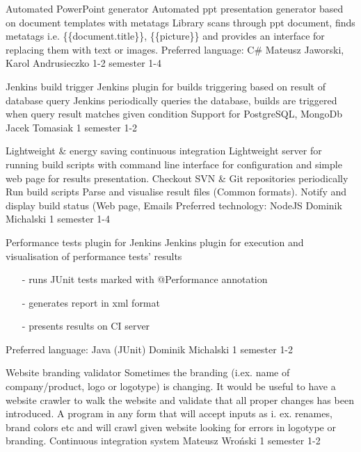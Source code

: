 \begin{project}
{Automated PowerPoint generator}
{Automated ppt presentation generator based on document templates with metatags} 
{ 
Library scans through ppt document, finds metatags i.e. \{\{document.title\}\},
\{\{picture\}\} and provides an interface for replacing them with text or
images.
}
{Preferred language: C\#}
{Mateusz Jaworski, Karol Andrusieczko}
{1-2 semester}
{1-4}
\end{project}
\begin{project}
{Jenkins build trigger}
{Jenkins plugin for builds triggering based on result of database query} 
{ 
Jenkins periodically queries the database, builds are triggered when query result matches given condition
}
{Support for PostgreSQL, MongoDb}
{Jacek Tomasiak}
{1 semester}
{1-2}
\end{project}
\begin{project}
{Lightweight \& energy saving continuous integration}
{Lightweight server for running build scripts with command line interface for configuration and simple web page for results presentation.} 
{ 
Checkout SVN \& Git repositories periodically Run build scripts Parse and
visualise result files (Common formats). Notify and display build status (Web page, Emails }
{Preferred technology: NodeJS}
{Dominik Michalski}
{1 semester}
{1-4}
\end{project}
\begin{project}
{Performance tests plugin for Jenkins}
{Jenkins plugin for execution and visualisation of performance tests’ results} 
{ 
\begin{itemize}
\item[-] runs JUnit tests marked with @Performance annotation
\item[-] generates report in xml format
\item[-] presents results on CI server
\end{itemize}
}
{Preferred language: Java (JUnit)}
{Dominik Michalski}
{1 semester}
{1-2}
\end{project}
\begin{project}
{Website branding validator}
{Sometimes the branding (i.ex. name of company/product, logo or logotype) is changing. It would be useful to have a website crawler to walk the website and validate that all proper changes has been introduced.} 
{
A program in any form that will accept inputs as i. ex. renames, brand colors etc and will crawl given website looking for errors in logotype or branding.
}
{Continuous integration system}
{Mateusz Wroński}
{1 semester}
{1-2}
\end{project}
